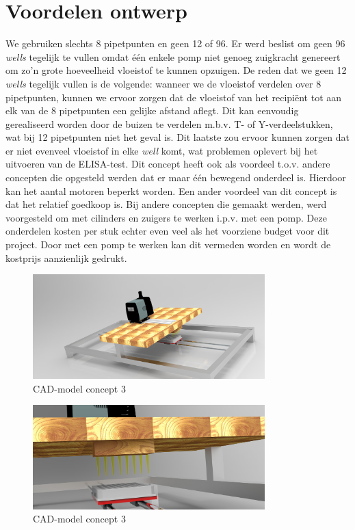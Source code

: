 \documentclass[a4paper,twoside,kulak]{kulakreport} %
\begin{document}
\section{Voordelen ontwerp}
	We gebruiken slechts 8 pipetpunten en geen 12 of 96. Er werd beslist om geen 96 \textit{wells} tegelijk te vullen omdat één enkele pomp niet genoeg zuigkracht genereert om zo'n grote hoeveelheid vloeistof te kunnen opzuigen. De reden dat we geen 12 \textit{wells} tegelijk vullen is de volgende: wanneer we de vloeistof verdelen over 8 pipetpunten, kunnen we ervoor zorgen dat de vloeistof van het recipiënt tot aan elk van de 8 pipetpunten een gelijke afstand aflegt. Dit kan eenvoudig gerealiseerd worden door de buizen te verdelen m.b.v. T- of Y-verdeelstukken, wat bij 12 pipetpunten niet het geval is. Dit laatste zou ervoor kunnen zorgen dat er niet evenveel vloeistof in elke \textit{well} komt, wat problemen oplevert bij het uitvoeren van de ELISA-test. Dit concept heeft ook als voordeel t.o.v. andere concepten die opgesteld werden dat er maar één bewegend onderdeel is. Hierdoor kan het aantal motoren beperkt worden. Een ander voordeel van dit concept is dat het relatief goedkoop is. Bij andere concepten die gemaakt werden, werd voorgesteld om met cilinders en zuigers te werken i.p.v. met een pomp. Deze onderdelen kosten per stuk echter even veel als het voorziene budget voor dit project. Door met een pomp te werken kan dit vermeden worden en wordt de kostprijs aanzienlijk gedrukt. 
	
\begin{figure}[h]
	\centering
	\includegraphics[width=0.8\textwidth]{micdis1.jpg}
	\caption{CAD-model concept 3}
	\label{fig: CAD-model globaal}
	
\end{figure} 

\begin{figure}[h]
	\centering
	\includegraphics[width=0.8\textwidth]{micdis2.jpg}
	\caption{CAD-model concept 3}
	\label{fig: CAD-model ingezoomd}
	
\end{figure} 
\end{document}
